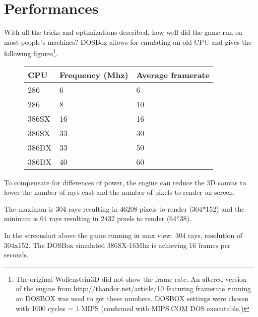 \section{Performances}
With all the tricks and optimizations described, how well did the game run on most people's machines? DOSBox allows for emulating an old CPU and gives the following figures\footnote{The original Wolfenstein3D did not show the frame rate. An altered version of the engine from http://thandor.net/article/10 featuring framerate running on DOSBOX was used to get these numbers. DOSBOX settings were chosen with 1000 cycles = 1 MIPS (confirmed with MIPS.COM DOS executable.)}.

\begin{figure}[H]
\centering
\begin{tabularx}{\textwidth}{ X X X }
  \toprule
  \textbf{CPU} & \textbf{Frequency (Mhz)} & \textbf{Average framerate} \\ \bottomrule
 286 & 6 & 6 \\
 286 & 8 & 10 \\
 386SX & 16 &  16 \\
 386SX & 33 & 30 \\
 386DX & 33 & 50 \\
 386DX & 40 & 60 \\ \bottomrule
\end{tabularx}
\end{figure}

To compensate for differences of power, the engine can reduce the 3D canvas to lower the number of rays cast and the number of pixels to render on screen.\\
\par
The maximun is 304 rays resulting in 46208 pixels to render (304*152) and the mininum is 64 rays resulting in 2432 pixels to render (64*38).\\

  \begin{figure}[H]
\centering
 \end{figure}
 \par
 In the screenshot above the game running in max view: 304 rays, resolution of 304x152. The DOSBox simulated 386SX-16Mhz is achieving 16 frames per seconds.

   \begin{figure}[H]
\centering
 \end{figure}
 \par

